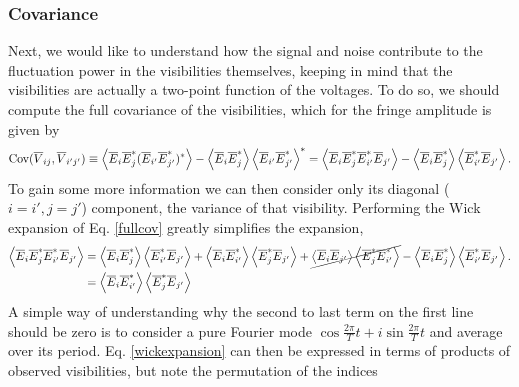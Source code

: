 \subsubsection{Covariance}
Next, we would like to understand how the signal and noise contribute to the fluctuation power in the visibilities themselves, keeping in mind that the visibilities are actually a two-point function of the voltages. To do so, we should compute the full covariance of the visibilities, which for the fringe amplitude is given by
\begin{equation}
{\rm Cov}(\overline{V}_{ij}, \overline{V}_{i'j'}) \equiv \left\langle \overline{E}_i \overline{E}_j^*(\overline{E}_{i'} \overline{E}_{j'}^*)^* \right\rangle  -  \left\langle \overline{E}_i \overline{E}_j^* \right\rangle \left\langle \overline{E}_{i'} \overline{E}_{j'}^* \right\rangle^*  = \left\langle \overline{E}_i \overline{E}_j^* \overline{E}_{i'}^* \overline{E}_{j'} \right\rangle - \left\langle \overline{E}_i \overline{E}_j^* \right\rangle \left\langle \overline{E}_{i'}^* \overline{E}_{j'} \right\rangle. \label{fullcov}
\end{equation} 
To gain some more information we can then consider only its diagonal ($i=i', j=j'$) component, the variance of that visibility. Performing the Wick expansion of Eq. \ref{fullcov} greatly simplifies the expansion,
\begin{align}
\left\langle \overline{E}_i \overline{E}_j^* \overline{E}_{i'}^* \overline{E}_{j'} \right\rangle 
&= \left\langle \overline{E}_i \overline{E}_j^* \right\rangle\left\langle \overline{E}_{i'}^* \overline{E}_{j'} \right\rangle  
+ \left\langle \overline{E}_i \overline{E}_{i'}^* \right\rangle\left\langle \overline{E}_{j}^* \overline{E}_{j'} \right\rangle  
+ \cancel{\left\langle \overline{E}_i \overline{E}_{j'} \right\rangle\left\langle\overline{E}_{j}^* \overline{E}_{i'}^* \right\rangle}  - \left\langle \overline{E}_i \overline{E}_j^* \right\rangle \left\langle \overline{E}_{i'}^* \overline{E}_{j'} \right\rangle.
\nonumber \\ & = \left\langle \overline{E}_i \overline{E}_{i'}^* \right\rangle\left\langle \overline{E}_{j}^* \overline{E}_{j'} \right\rangle  \label{wickexpansion}
\end{align}
A simple way of understanding why the second to last term on the first line should be zero is to consider a pure Fourier mode $\cos{\frac{2\pi}{T} t} + i \sin{\frac{2\pi}{T} t}$ and average over its period. Eq. \ref{wickexpansion} can then be expressed in terms of products of observed visibilities, but note the permutation of the indices
